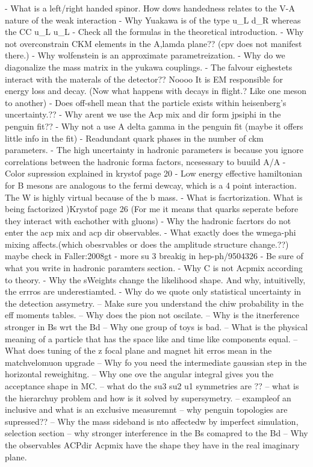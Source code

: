 - What is a left/right handed spinor. How dows handedness relates to the V-A nature of the weak interaction
- Why Yuakawa is of the type u_L d_R whereas the CC u_L u_L
- Check all the formulas in the theoretical introduction.
- Why not overconstrain CKM elements in the A,lamda plane?? (cpv does not manifest there.)
- Why wolfenstein is an approximate parametreization.
- Why do we diagonalize the mass matrix in the yukawa couplings.
- The falvour eighestets interact with the materals of the detector?? Noooo
  It is EM responsible for energy loss and decay. (Now what happens with decays in flight.? Like one meson to another)
- Does off-shell mean that the particle exists within heisenberg's uncertainty.??
- Why arent we use the Acp mix and dir form jpsiphi in the penguin fit??
- Why not a use A delta gamma in the penguin fit (maybe it offers little info in the fit)
- Readundant quark phases in the number of ckm parameters.
- The high uncertainty in hadronic parameters is because you ignore correlations between the hadronic forma factors, ncesessary to buuild A/A
- Color supression  explained in krystof page 20
- Low energy effective hamiltonian for B mesons are analogous to the fermi dewcay, which is a 4 point interaction. The W is highly virtual because of the b mass.
- What is facrtorization. What is being factorized )Krystof page 26 (For me it means that quarks seperate before they interact with eachother with gluons)
- Why the hadronic facrtors do not enter the acp mix and acp dir observables.
- What exactly does the wmega-phi mixing affects.(which obesrvables or does the amplitude structure change.??)  maybe check in  {Faller:2008gt}
- more su 3 breakig in hep-ph/9504326
- Be sure of what you write in hadronic paramters section.
- Why C is not Acpmix according to theory.
- Why the sWeights change the likelihood shape. And why, intuitivelly, the errros are underestiamted.
- Why do we quote only statistical uncertainty in the detection assymetry.
-- Make sure you understand the chiw probability in the eff moments tables.
-- Why does the pion not oscilate.
-- Why is the itnerference stronger in Bs wrt the Bd
-- Why one group of toys is bad.
-- What is the physical meaning of a particle that has the space like and time like components equal.
-- What does tuning of the z focal plane and magnet hit erros mean in the matchvelomuon upgrade
-- Why fo you need the intermediate gaussian step in the horizontal reweighitng.
-- Why one ove the angular \pdf integral gives you the acceptance shape in MC.
-- what do the su3 su2 u1 symmetries are ??
-- what is the hierarchuy problem and how is it solved by supersymetry.
-- exampleof an inclusive and what is an exclusive measuremnt 
-- why penguin topologies are supressed??
-- Why the mass sideband is nto affectedw by imperfect simulation, selection section 
-- why stronger interference in the Bs comapred to the Bd
-- Why the observables ACPdir Acpmix have the shape they have in the real imaginary plane.


